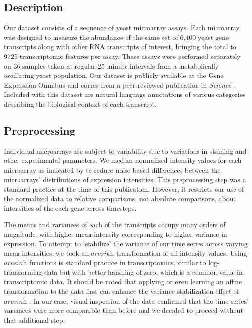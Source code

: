 \documentclass[11pt]{amsart}
\begin{document}

\subsection{Description}

Our dataset consists of a sequence of yeast microarray assays. Each microarray was designed to measure the abundance of the same set of 6,400 yeast gene transcripts along with other RNA transcripts of interest, bringing the total to 9725 transcriptomic features per assay. These assays were performed separately on 36 samples taken at regular 25-minute intervals from a metabolically oscillating yeast population. Our dataset is publicly available at the Gene Expression Omnibus \cite{GEO2005} and comes from a peer-reviewed publication in \textit{Science} \cite{Tu2005}. Included with this dataset are natural language annotations of various categories describing the biological context of each transcript.

\subsection{Preprocessing}
Individual microarrays are subject to variability due to variations in staining and other experimental parameters. We median-normalized intensity values for each microarray as indicated by \cite{Tu2005} to reduce noise-based differences between the microarrays' distributions of expression intensities. This preprocessing step was a standard practice at the time of this publication. However, it restricts our use of the normalized data to relative comparisons, not absolute comparisons, about intensities of the each gene across timesteps.

The means and variances of each of the transcripts occupy many orders of magnitude, with higher mean intensity corresponding to higher variance in expression. To attempt to `stabilize' the variance of our time series across varying mean intensities, we took an $\textit{arcsinh}$ transformation of all intensity values. Using $\textit{arcsinh}$ functions is standard practice in transcriptomics, similar to log-transforming data but with better handling of zero, which is a common value in transcriptomic data. It should be noted that applying or even learning an affine transformation to the data first can enhance the variance stabilization effect of $\textit{arcsinh}$ \cite{Huber2002}. In our case, visual inspection of the data confirmed that the time series' variances were more comparable than before and we decided to proceed without that additional step.
\end{document}
